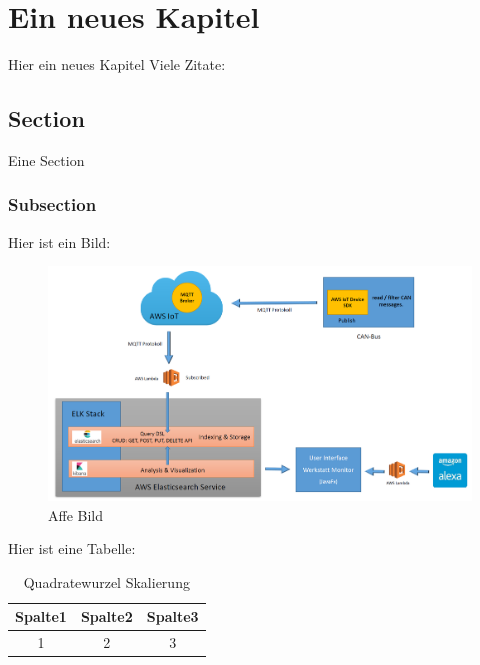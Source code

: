 \chapter{Ein neues Kapitel}
    Hier ein neues Kapitel
    Viele Zitate: \cite{patterson} \cite{krizhevsky} \cite{matlab} \cite{pitts} \cite{lawrence} \cite{miesbach}
    \section{Section}
        Eine Section
        \subsection{Subsection}
        
        
Hier ist ein Bild:        
            \begin{figure}[h]
                \includegraphics[scale=0.2]{Abbildungen/Kapitel4/Big-architecture.png}
                \centering
                \caption{Affe Bild}
                \label{Abb:Affe}   
            \end{figure}  
            
Hier ist eine Tabelle:            
            
             \begin{table}[h]
                \begin{tabular}{ccc}
                      \hline
                      Spalte1 & Spalte2 & Spalte3\\                      
                      \hline
                      1 & 2 & 3\\
                      \hline
                \end{tabular}
                \centering
                \caption{Quadratewurzel Skalierung}
                \label{Tab:Quadratewurzel Skalierung}
            \end{table}
            
